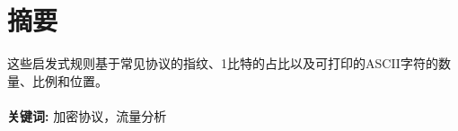 \section*{摘要} %
这些启发式规则基于常见协议的指纹、1比特的占比以及可打印的ASCII字符的数量、比例和位置。\\ \\
\noindent \textbf{关键词:} 加密协议，流量分析

\newpage